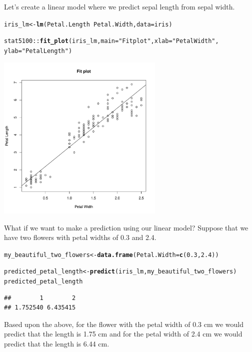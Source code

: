 \documentclass{article}\usepackage[]{graphicx}\usepackage[]{color}
\makeatletter
\newcommand{\hlnum}[1]{\textcolor[rgb]{0.686,0.059,0.569}{#1}}%
\newcommand{\hlstr}[1]{\textcolor[rgb]{0.192,0.494,0.8}{#1}}%
\newcommand{\hlopt}[1]{\textcolor[rgb]{0,0,0}{#1}}%
\newcommand{\hlstd}[1]{\textcolor[rgb]{0.345,0.345,0.345}{#1}}%
\newcommand{\hlkwb}[1]{\textcolor[rgb]{0.69,0.353,0.396}{#1}}%
\newcommand{\hlkwc}[1]{\textcolor[rgb]{0.333,0.667,0.333}{#1}}%
\newcommand{\hlkwd}[1]{\textcolor[rgb]{0.737,0.353,0.396}{\textbf{#1}}}%
\newenvironment{kframe}{%
 \def\at@end@of@kframe{}%
 \ifinner\ifhmode%
  \def\at@end@of@kframe{\end{minipage}}%
  \begin{minipage}{\columnwidth}%
 \fi\fi%
 \def\FrameCommand##1{\hskip\@totalleftmargin \hskip-\fboxsep
 \colorbox{shadecolor}{##1}\hskip-\fboxsep
     \hskip-\linewidth \hskip-\@totalleftmargin \hskip\columnwidth}%
 \MakeFramed {\advance\hsize-\width
   \@totalleftmargin\z@ \linewidth\hsize
   \@setminipage}}%
 {\par\unskip\endMakeFramed%
 \at@end@of@kframe}
\newenvironment{knitrout}{}{} %
\makeatother
\begin{document}
Let's create a linear model where we predict sepal length from sepal width.

\begin{knitrout}
\color{fgcolor}\begin{kframe}
\begin{alltt}
\hlstd{iris_lm} \hlkwb{<-} \hlkwd{lm}\hlstd{(Petal.Length} \hlopt{~} \hlstd{Petal.Width,} \hlkwc{data} \hlstd{= iris)}

\hlstd{stat5100}\hlopt{::}\hlkwd{fit_plot}\hlstd{(iris_lm,} \hlkwc{main} \hlstd{=} \hlstr{"Fit plot"}\hlstd{,} \hlkwc{xlab} \hlstd{=} \hlstr{"Petal Width"}\hlstd{,}
                   \hlkwc{ylab} \hlstd{=} \hlstr{"Petal Length"}\hlstd{)}
\end{alltt}
\end{kframe}

{\centering \includegraphics[width=0.6\textwidth]{figure/unnamed-chunk-3-1} 

}



\end{knitrout}

What if we want to make a prediction using our linear model? Suppose that we have two flowers with petal widths of 0.3 and 2.4.

\begin{knitrout}
\color{fgcolor}\begin{kframe}
\begin{alltt}
\hlstd{my_beautiful_two_flowers} \hlkwb{<-} \hlkwd{data.frame}\hlstd{(}\hlkwc{Petal.Width} \hlstd{=} \hlkwd{c}\hlstd{(}\hlnum{0.3}\hlstd{,} \hlnum{2.4}\hlstd{))}

\hlstd{predicted_petal_length} \hlkwb{<-} \hlkwd{predict}\hlstd{(iris_lm, my_beautiful_two_flowers)}
\hlstd{predicted_petal_length}
\end{alltt}
\begin{verbatim}
##        1        2 
## 1.752540 6.435415
\end{verbatim}
\end{kframe}
\end{knitrout}

Based upon the above, for the flower with the petal width of 0.3 cm we would predict that the length is 1.75 cm and for the petal width of 2.4 cm we would predict that the length is 6.44 cm.
\end{document}
